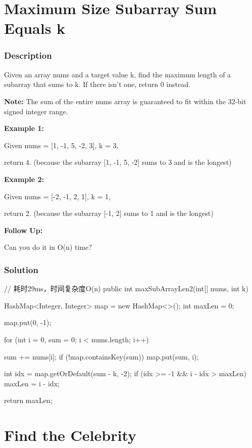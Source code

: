 \newpage

\section{Maximum Size Subarray Sum Equals k} %

\subsubsection{Description}
Given an array nums and a target value k, find the maximum length of a subarray that sums to k. If there isn't one, return 0 instead.

\textbf{Note:}
The sum of the entire nums array is guaranteed to fit within the 32-bit signed integer range.

\textbf{Example 1:}

Given nums = [1, -1, 5, -2, 3], k = 3,

return 4. (because the subarray [1, -1, 5, -2] sums to 3 and is the longest)

\textbf{Example 2:}

Given nums = [-2, -1, 2, 1], k = 1,

return 2. (because the subarray [-1, 2] sums to 1 and is the longest)

\textbf{Follow Up:}

Can you do it in O(n) time?

\subsubsection{Solution}

\begin{Code}
// 耗时29ms，时间复杂度O(n)
public int maxSubArrayLen2(int[] nums, int k) {
    HashMap<Integer, Integer> map = new HashMap<>();
    int maxLen = 0;

    map.put(0, -1);

    for (int i = 0, sum = 0; i < nums.length; i++) {
        sum += nums[i];
        if (!map.containsKey(sum)) {
            map.put(sum, i);
        }

        int idx = map.getOrDefault(sum - k, -2);
        if (idx >= -1 && i - idx > maxLen) {
            maxLen = i - idx;
        }
    }

    return maxLen;
}
\end{Code}

\newpage

\section{Find the Celebrity} %

